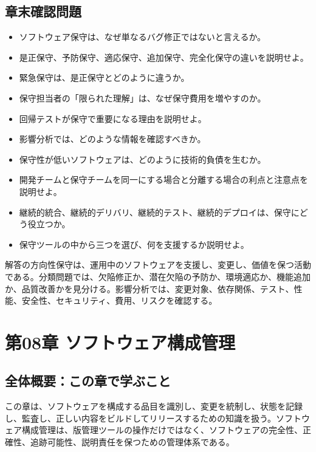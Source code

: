 \documentclass[a4paper,11pt]{ltjsarticle}
\numberwithin{figure}{section}
\numberwithin{table}{section}
\begin{document}
\subsection{章末確認問題}
\begin{itemize}
\item ソフトウェア保守は、なぜ単なるバグ修正ではないと言えるか。
\item 是正保守、予防保守、適応保守、追加保守、完全化保守の違いを説明せよ。
\item 緊急保守は、是正保守とどのように違うか。
\item 保守担当者の「限られた理解」は、なぜ保守費用を増やすのか。
\item 回帰テストが保守で重要になる理由を説明せよ。
\item 影響分析では、どのような情報を確認すべきか。
\item 保守性が低いソフトウェアは、どのように技術的負債を生むか。
\item 開発チームと保守チームを同一にする場合と分離する場合の利点と注意点を説明せよ。
\item 継続的統合、継続的デリバリ、継続的テスト、継続的デプロイは、保守にどう役立つか。
\item 保守ツールの中から三つを選び、何を支援するか説明せよ。
\end{itemize}
\begin{pointbox}{解答の方向性}保守は、運用中のソフトウェアを支援し、変更し、価値を保つ活動である。分類問題では、欠陥修正か、潜在欠陥の予防か、環境適応か、機能追加か、品質改善かを見分ける。影響分析では、変更対象、依存関係、テスト、性能、安全性、セキュリティ、費用、リスクを確認する。\end{pointbox}

\section{第08章 ソフトウェア構成管理}
\subsection*{全体概要：この章で学ぶこと}
この章は、ソフトウェアを構成する品目を識別し、変更を統制し、状態を記録し、監査し、正しい内容をビルドしてリリースするための知識を扱う。ソフトウェア構成管理は、版管理ツールの操作だけではなく、ソフトウェアの完全性、正確性、追跡可能性、説明責任を保つための管理体系である。
\end{document}
